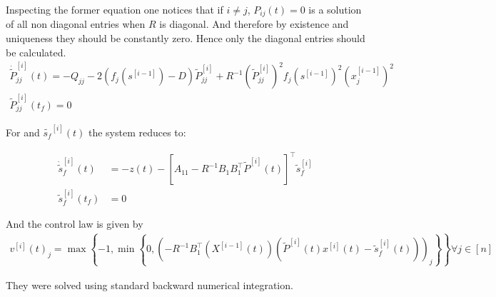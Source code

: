 \documentclass[3p,times]{elsarticle}
\begin{document}
Inspecting the former equation one notices that if $i\neq j$, $P_{ij}(t) = 0$ is a solution of all non diagonal entries when $R$ is diagonal. And therefore by existence and uniqueness they should be constantly zero. Hence only the diagonal entries should be calculated. 
\begin{align}
\dot{\tilde{P}}^{[i]}_{jj}(t)= -Q_{jj}- 2 \left(f_j\left(s^{[i-1]}\right)- D \right)\tilde{P}^{[i]}_{jj} + R^{-1}\left(\tilde{P}^{[i]}_{jj}\right)^2f_j\left(s^{[i-1]}\right)^2\left(x^{[i-1]}_j\right)^2  \\
\tilde{P}^{[i]}_{jj}(t_f) = 0
\end{align}

For and  $\tilde{s_f}^{[i]}(t)$ the system reduces to:

\begin{align}
\dot{\tilde{s}}_f^{[i]}(t) &= -z(t)- \left[A_{11} -R^{-1}B_1B_1^\top \tilde{P}^{[i]}(t) \right]^\top \tilde{s}_f^{[i]} \\
\tilde{s}_f^{[i]}(t_f) &= 0
\end{align}

And the control law is given by
\begin{align}
v^{[i]}(t)_j = \max \left\{ -1,\min\left\{0,\left( -R^{-1}B_1^\top\left(X^{[i-1]}(t)\right)\left(\tilde{P}^{[i]}(t)x^{[i]}(t)-\tilde{s}_f^{[i]}(t)\right)\right)_j \right\}\right\} \forall j \in [n]
\end{align} 

They were solved using standard backward numerical integration.
\end{document}
